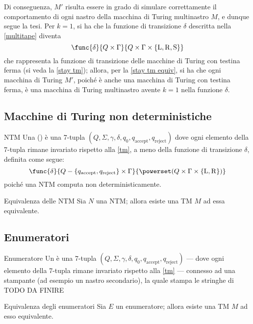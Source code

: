 \documentclass[a4paper, 12pt]{report}
\begin{document}
{        Di conseguenza, $M'$ risulta essere in grado di simulare correttamente il comportamento di ogni nastro della macchina di Turing multinastro $M$, e dunque segue la tesi.
    }{
        Per $k = 1$, si ha che la funzione di transizione $\delta$ descritta nella \cref{multitape} diventa $$\func{\delta}{Q \times \Gamma}{Q \times \Gamma \times \{ \mathrm L, \mathrm R, \mathrm S\}}$$ che rappresenta la funzione di transizione delle macchine di Turing con testina ferma (si veda la \cref{stay tm}); allora, per la \cref{stay tm equiv}, si ha che ogni macchina di Turing $M'$, poiché è anche una macchina di Turing con testina ferma, è una macchina di Turing multinastro avente $k = 1$ nella funzione $\delta$.
    }

    \subsection{Macchine di Turing non deterministiche}

    \begin{frameddefn}{NTM}
        Una  () è una 7-tupla $(Q, \Sigma, \gamma, \delta, q_0, q_\mathrm{accept}, q_\mathrm{reject})$ dove ogni elemento della 7-tupla rimane invariato rispetto alla \cref{tm}, a meno della funzione di transizione $\delta$, definita come segue: $$\func{\delta}{Q-\{q_\mathrm{accept}, q_\mathrm{reject}\} \times \Gamma}{\powerset(Q \times \Gamma \times \{ \mathrm L, \mathrm R\})}$$ poiché una NTM computa non deterministicamente.
    \end{frameddefn}

    \begin{framedprop}{Equivalenza delle NTM}
        Sia $N$ una NTM; allora esiste una TM $M$ ad essa equivalente.
    \end{framedprop}


    \subsection{Enumeratori}

    \begin{frameddefn}{Enumeratore}
        Un  è una 7-tupla $(Q, \Sigma, \gamma, \delta, q_0, q_\mathrm{accept}, q_\mathrm{reject})$ --- dove ogni elemento della 7-tupla rimane invariato rispetto alla \cref{tm} --- connesso ad una stampante (ad esempio un nastro secondario), la quale stampa le stringhe di TODO DA FINIRE
    \end{frameddefn}

    \begin{framedprop}{Equivalenza degli enumeratori}
        Sia $E$ un enumeratore; allora esiste una TM $M$ ad esso equivalente.
    \end{framedprop}

\end{document}

